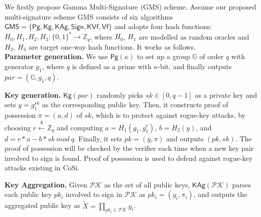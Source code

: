 \documentclass[journal]{IEEEtran}
\begin{document}

We firstly propose Gamma Multi-Signature (GMS) scheme. Assume our proposed multi-signature scheme GMS consists of six algorithms \(\textsf{GMS}=\{\textsf{Pg},\textsf{Kg},\textsf{KAg},\textsf{Sign},\textsf{KVf},\textsf{Vf}\}\) and adopts four hash functions:  \(H_0,H_1,H_2,H_3:\{0,1\}^*\rightarrow\mathbb{Z}_q\), where \(H_0\), \(H_1\) are modelled as random oracles and \(H_2\), \(H_3\) are target one-way hash functions. It works as follows.\\

\noindent\textbf{Parameter generation.} We use \(\textsf{Pg}(\kappa)\) to set up a group \(\mathbb{G}\) of order \(q\)  with generator \(g_1\), where \(q\) is defined as a prime with  \(\kappa\)-bit, and finally outputs \(par=(\mathbb{G},g_1,q)\).

\noindent\textbf{Key generation.} \(\textsf{Kg}(par)\) randomly picks \(sk\in [0,q-1]\) as a private key and sets \(y = g_1^{sk}\) as the corresponding public key. Then, it constructs proof of possession \(\pi=(a,d)\) of \(sk\), which is to protect against rogue-key attacks, by choosing \(r\stackrel{\$}{\leftarrow} \mathbb{Z}_q\) and computing \(a= H_1(g_1,g_1^r)\), \(b= H_2(y)\), and \(d= r*a-b*sk\ mod\ q\). Finally, it sets \(pk= (y,\pi)\) and outputs \((pk,sk)\). The proof of possession will be checked by the verifier each time when a new key pair involved to sign is found. Proof of possession is used to defend against rogue-key attacks existing in CoSi.

\noindent\textbf{Key Aggregation.} Given \(\mathcal{PK}\) as the set of all public keys, \(\textsf{KAg}(\mathcal{PK})\) parses each public key \({pk_i}\) involved to sign in \(\mathcal{PK}\) as \( pk_i=(y_i,\pi_i)\),
and outputs the aggregated public key as \(\tilde{X}= \prod_{pk_i\in\mathcal{PK}}{y_i}\).
\end{document}
